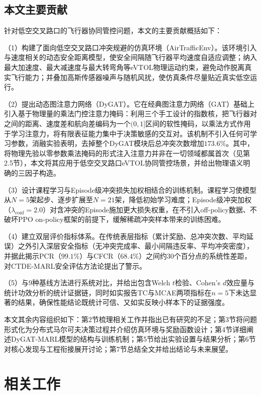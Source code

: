 \documentclass[12pt,a4paper,UTF8]{ctexart}
\begin{document}
\subsection{本文主要贡献}

针对低空交叉路口的飞行器协同管控问题，本文的主要贡献概括如下：

（1）构建了面向低空交叉路口冲突规避的仿真环境（AirTrafficEnv）。该环境引入与速度相关的动态安全距离模型，使安全间隔随飞行器平均速度自适应调整；纳入最大加速度、最大减速度与最大转弯角等eVTOL物理运动约束，避免动作脱离真实飞行能力；并叠加高斯传感器噪声与随机风扰，使仿真条件尽量贴近真实低空运行。

（2）提出动态图注意力网络（DyGAT）。它在经典图注意力网络（GAT）基础上引入基于物理量的乘法门控注意力掩码：利用三个手工设计的指数核，把飞行器对之间的距离、速度差和航向差编码为一个$(0,1]$区间的软性掩码，以乘法方式作用于学习注意力，将有限表征能力集中于决策敏感的交互对。该机制不引入任何可学习参数，消融实验表明，去掉整个DyGAT模块后总冲突次数增加$173.6\%$。其中，将物理先验以零参数乘法掩码的形式注入注意力并非在一切领域都属首次（见第2.5节），本文将其应用于低空交叉路口eVTOL协同管控场景，并给出物理语义明确的三因子构造。

（3）设计课程学习与Episode级冲突损失加权相结合的训练机制。课程学习使模型从$N=5$架起步、逐步扩展至$N=21$架，降低初始学习难度；Episode级冲突加权（$\lambda_{\text{conf}}=2.0$）对含冲突的Episode施加更大损失权重，在不引入off-policy数据、不破坏PPO on-policy框架的前提下，缓解稀疏冲突样本带来的训练困难。

（4）建立双层评价指标体系。在传统表层指标（累计奖励、总冲突次数、平均延误）之外引入深层安全指标（无冲突完成率、最小间隔违反率、平均冲突密度），并据此揭示PCR（$99.1\%$）与CFCR（$68.4\%$）之间约30个百分点的系统性差距，对CTDE-MARL安全评估方法论提出了警示。

（5）与9种基线方法进行系统对比，并给出包含Welch $t$检验、Cohen's $d$效应量与统计功效分析的统计证据链，同时如实报告TC与MCAE两项指标在$n=5$下未达显著的结果，确保性能结论既统计可信、又如实反映小样本下的证据强度。

本文其余内容组织如下：第2节梳理相关工作并指出已有研究的不足；第3节将问题形式化为分布式马尔可夫决策过程并介绍仿真环境与奖励函数设计；第4节详细阐述DyGAT-MARL模型的结构与训练机制；第5节给出实验设置与结果分析；第6节对核心发现与工程衔接展开讨论；第7节总结全文并给出结论与未来展望。

\section{相关工作}
\end{document}
